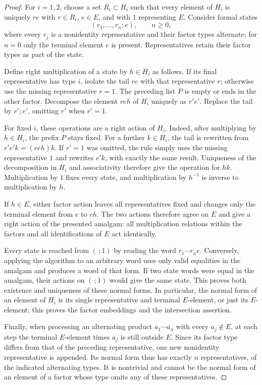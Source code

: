 \begin{proof}
For $i=1,2$, choose a set $R_i\subset H_i$ such that every element
of $H_i$ is uniquely $re$ with $r\in R_i$, $e\in E$, and with $1$
representing $E$.  Consider formal states
\[
 (r_1,\ldots,r_n;e),\qquad n\ge0,
\]
where every $r_j$ is a nonidentity representative and their factor
types alternate; for $n=0$ only the terminal element $e$ is present.
Representatives retain their factor types as part of the state.

Define right multiplication of a state by $h\in H_i$ as follows.
If its final representative has type $i$, isolate the tail $re$
with that representative $r$; otherwise use the missing
representative $r=1$.  The preceding list $P$ is empty or ends in
the other factor.  Decompose the element $reh$ of $H_i$ uniquely as
$r'e'$.  Replace the tail by $r';e'$, omitting $r'$ when $r'=1$.

For fixed $i$, these operations are a right action of $H_i$.
Indeed, after multiplying by $h\in H_i$, the prefix $P$ stays fixed.
For a further $k\in H_i$, the tail is rewritten from
$r'e'k=(reh)k$.  If $r'=1$ was omitted, the rule simply uses the
missing representative $1$ and rewrites $e'k$, with exactly the
same result.  Uniqueness of the decomposition in $H_i$ and
associativity therefore give the operation for $hk$.  Multiplication
by $1$ fixes every state, and multiplication by $h^{-1}$ is inverse
to multiplication by $h$.

If $h\in E$, either factor action leaves all representatives fixed
and changes only the terminal element from $e$ to $eh$.  The two
actions therefore agree on $E$ and give a right action of the
presented amalgam: all multiplication relations within the factors
and all identifications of $E$ act identically.

Every state is reached from $(\,;1)$ by reading the word
$r_1\cdots r_ne$.  Conversely, applying the algorithm to an arbitrary
word uses only valid equalities in the amalgam and produces a word
of that form.  If two state words were equal in the amalgam, their
actions on $(\,;1)$ would give the same state.  This proves both
existence and uniqueness of these normal forms.  In particular,
the normal form of an element of $H_i$ is its single representative
and terminal $E$-element, or just its $E$-element; this proves the
factor embeddings and the intersection assertion.

Finally, when processing an alternating product $a_1\cdots a_n$
with every $a_j\notin E$, at each step the terminal $E$-element
times $a_j$ is still outside $E$.  Since its factor type differs
from that of the preceding representative, one new nonidentity
representative is appended.  Its normal form thus has exactly $n$
representatives, of the indicated alternating types.  It is
nontrivial and cannot be the normal form of an element of a factor
whose type omits any of these representatives.
\end{proof}

